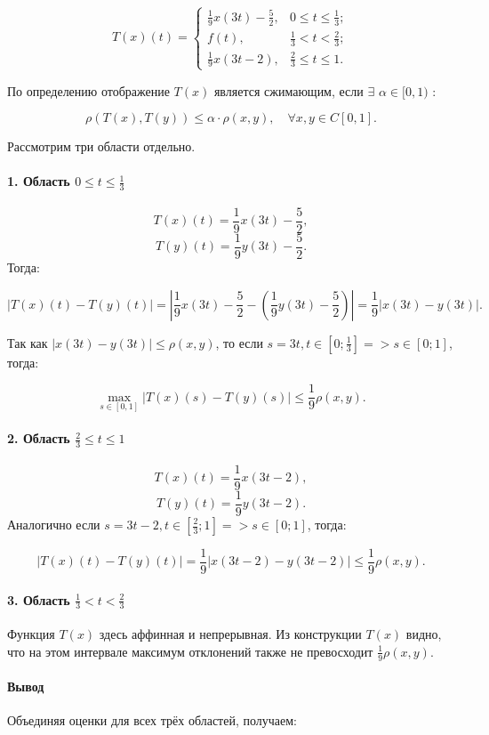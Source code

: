 \documentclass{article}
\begin{document}
\[
T(x)(t) =
\begin{cases}
\frac{1}{9} x(3t) - \frac{5}{2}, & 0 \leq t \leq \frac{1}{3}; \\
f(t), & \frac{1}{3} < t < \frac{2}{3}; \\
\frac{1}{9} x(3t-2), & \frac{2}{3} \leq t \leq 1.
\end{cases}
\]

По определению отображение \( T(x) \) является сжимающим, если $\exists$ \( \alpha \in [0,1) \) :

\[
\rho(T(x), T(y)) \leq \alpha \cdot \rho(x, y), \quad \forall x, y \in C[0,1].
\]

Рассмотрим три области отдельно.

\paragraph{1. Область \( 0 \leq t \leq \frac{1}{3} \)}  
\[
T(x)(t) = \frac{1}{9} x(3t) - \frac{5}{2},
\]
\[
T(y)(t) = \frac{1}{9} y(3t) - \frac{5}{2}.
\]
Тогда:

\[
|T(x)(t) - T(y)(t)| = \left| \frac{1}{9} x(3t) - \frac{5}{2} - \left(\frac{1}{9} y(3t) - \frac{5}{2} \right) \right| = \frac{1}{9} |x(3t) - y(3t)|.
\]

Так как \( |x(3t) - y(3t)| \leq \rho(x, y) \), то если $s = 3t, t \in [0; \frac{1}{3}] =>  s \in [0; 1]$, тогда:

\[
\max_{s \in [0,1]} |T(x)(s) - T(y)(s)| \leq \frac{1}{9} \rho(x, y).
\]

\paragraph{2. Область \( \frac{2}{3} \leq t \leq 1 \)}  
\[
T(x)(t) = \frac{1}{9} x(3t - 2),
\]
\[
T(y)(t) = \frac{1}{9} y(3t - 2).
\]
Аналогично если $s = 3t - 2, t \in [\frac{2}{3}; 1] =>  s \in [0; 1]$, тогда:

\[
|T(x)(t) - T(y)(t)| = \frac{1}{9} |x(3t - 2) - y(3t - 2)| \leq \frac{1}{9} \rho(x, y).
\]

\paragraph{3. Область \( \frac{1}{3} < t < \frac{2}{3} \)}  
Функция \( T(x) \) здесь аффинная и непрерывная. Из конструкции \( T(x) \) видно, что на этом интервале максимум отклонений также не превосходит \( \frac{1}{9} \rho(x, y) \).

\paragraph{Вывод}  
Объединяя оценки для всех трёх областей, получаем:
\end{document}

